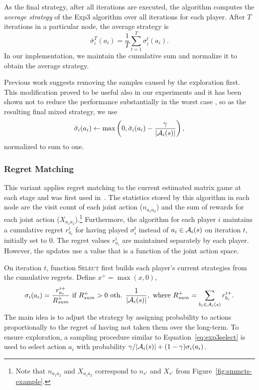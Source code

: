 As the final strategy, after all iterations are executed, the algorithm computes the \emph{average strategy} of the Exp3 algorithm over all iterations for each player.
 After $T$ iterations in a particular node, the average strategy is
\begin{equation}
\bar{\sigma}^T_i(a_i) = \frac{1}{T}\sum_{t=1}^T \sigma^t_i(a_i).
\end{equation}
In our implementation, we maintain the cumulative sum and normalize it to obtain the average strategy.

Previous work \cite{Teytaud11Upper} suggests removing the samples caused by the exploration first.
This modification proved to be useful also in our experiments and it has been shown not to reduce the performance substantially in the worst case \cite{Kovarik2015Analysis},
so as the resulting final mixed strategy, we use
\begin{equation}
\bar{\sigma}_i(a_i) \leftarrow \max\left(0, \bar{\sigma}_i(a_i) - \frac{\gamma}{|\mathcal{A}_i(s)|}\right),
\end{equation}
normalized to sum to one.

\subsubsection{Regret Matching} \label{sec:rm}

This variant applies regret matching \cite{Hart00} to the current estimated matrix game at each stage and was first used in~\cite{Lanctot13Goofspiel}. The statistics stored by this algorithm in each node are the visit count of each joint action ($n_{a_1a_2}$) and the sum of rewards for each joint action ($X_{a_1a_2}$).\footnote{Note that $n_{a_1a_2}$ and $X_{a_1a_2}$ correspond to $n_{s'}$ and $X_{s'}$ from Figure~\ref{fig:smmcts-example}.}
Furthermore, the algorithm for each player $i$ maintains a cumulative regret $r^i_{a_i}$ for having played $\sigma_i^t$ instead of $a_i \in \mathcal{A}_i(s)$ on iteration $t$, initially set to 0. The regret values $r^i_{a_i}$ are maintained separately by each player. However, the updates use a value that is a function of the joint action space.

On iteration $t$, function \textsc{Select} first builds
each player's current strategies from the cumulative regrets. Define $x^+ = \max(x,0)$,
\begin{equation}
\label{eq:rm}
\sigma_i(a_i) = \frac{r^{i+}_{a_i}}{R^+_{sum}} \mbox{ if } R^+_{sum} > 0
\mbox{ oth. } \frac{1}{|\mathcal{A}_i(s)|}, \mbox{ where } R^+_{sum} = \sum_{b_i \in \mathcal{A}_i(s)}{r^{i+}_{b_i}}.
\end{equation}
The main idea is to adjust the strategy by assigning probability to actions proportionally to the regret of having not taken them over the long-term.
To ensure exploration, a sampling procedure similar to Equation~\ref{eq:exp3select} is used to select action $a_i$ with probability
$\gamma/|\mathcal{A}_i(s)| + (1-\gamma) \sigma_i(a_i)$.

